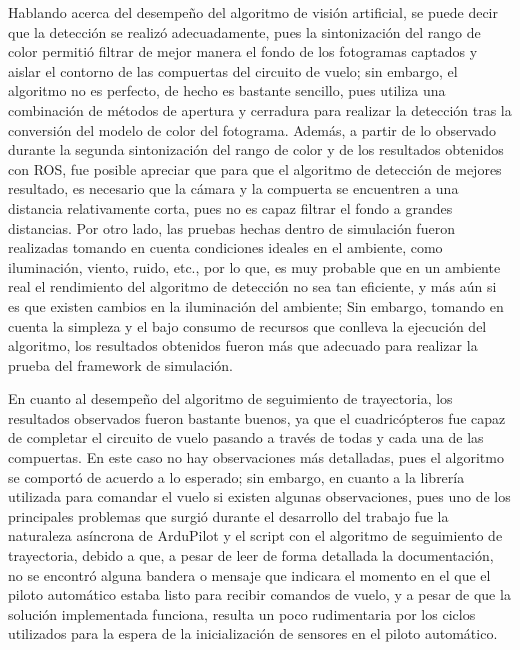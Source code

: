 Hablando acerca del desempeño del algoritmo de visión artificial, se puede decir que la detección se realizó adecuadamente, pues la sintonización del rango de color permitió filtrar de mejor manera el fondo de los fotogramas captados y aislar el contorno de las compuertas del circuito de vuelo; sin embargo, el algoritmo no es perfecto, de hecho es bastante sencillo, pues utiliza una combinación de métodos de apertura y cerradura para realizar la detección tras la conversión del modelo de color del fotograma. Además, a partir de lo observado durante la segunda sintonización del rango de color y de los resultados obtenidos con ROS, fue posible apreciar que para que el algoritmo de detección de mejores resultado, es necesario que la cámara  y la compuerta se encuentren a una distancia relativamente corta, pues no es capaz filtrar el fondo a grandes distancias. Por otro lado, las pruebas hechas dentro de simulación fueron realizadas tomando en cuenta condiciones ideales en el ambiente, como iluminación, viento, ruido, etc., por lo que, es muy probable que en un ambiente real el rendimiento del algoritmo de detección no sea tan eficiente, y más aún si es que existen cambios en la iluminación del ambiente; Sin embargo, tomando en cuenta la simpleza y el bajo consumo de recursos que conlleva la ejecución del algoritmo, los resultados obtenidos fueron más que adecuado para realizar la prueba del framework de simulación. 

En cuanto al desempeño del algoritmo de seguimiento de trayectoria, los resultados observados fueron bastante buenos, ya que el cuadricópteros fue capaz de completar el circuito de vuelo pasando a través de todas y cada una de las compuertas. En este caso no hay observaciones más detalladas, pues el algoritmo se comportó de acuerdo a lo esperado; sin embargo, en cuanto a la librería utilizada para comandar el vuelo si existen algunas observaciones, pues uno de los principales problemas que surgió durante el desarrollo del trabajo fue la naturaleza asíncrona de ArduPilot y el script con el algoritmo de seguimiento de trayectoria, debido a que, a pesar de leer de forma detallada la documentación, no se encontró alguna bandera o mensaje que indicara el momento en el que el piloto automático estaba listo para recibir comandos de vuelo, y a pesar de que la solución implementada funciona, resulta un poco rudimentaria por los ciclos utilizados para la espera de la inicialización de sensores en el piloto automático.

